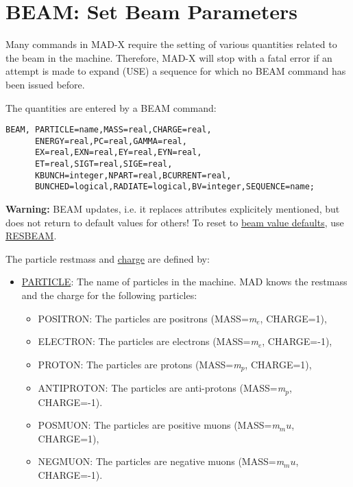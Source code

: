 
\section{BEAM: Set Beam Parameters}

Many commands in MAD-X require the setting of various quantities related
to the beam in the machine. Therefore, MAD-X will stop with a fatal
error if an attempt is made to expand (USE) a sequence for which no BEAM
command has been issued before.  

The quantities are entered by a BEAM command: 
\begin{verbatim}
BEAM, PARTICLE=name,MASS=real,CHARGE=real,
      ENERGY=real,PC=real,GAMMA=real,
      EX=real,EXN=real,EY=real,EYN=real,
      ET=real,SIGT=real,SIGE=real,
      KBUNCH=integer,NPART=real,BCURRENT=real,
      BUNCHED=logical,RADIATE=logical,BV=integer,SEQUENCE=name;
\end{verbatim} 

{\bf Warning:} BEAM updates, i.e. it replaces attributes explicitely
mentioned, but does not return to default values for others! To reset to
\href{resbeam.html#defaults}{beam value defaults},  use
\href{resbeam.html}{RESBEAM}.

The particle restmass and \href{charge}{charge} are defined by:
\begin{itemize}
   \item \href{particle}{PARTICLE}: The name of particles in the
     machine. MAD knows the restmass and the charge for the
     following particles:  
     \begin{itemize}
	  \item POSITRON: The particles are positrons (MASS=\textit{m$_e$}, CHARGE=1), 
	  \item ELECTRON: The particles are electrons (MASS=\textit{m$_e$}, CHARGE=-1), 
	  \item PROTON: The particles are protons (MASS=\textit{m$_p$}, CHARGE=1), 
	  \item ANTIPROTON: The particles are anti-protons (MASS=\textit{m$_p$}, CHARGE=-1). 
	  \item POSMUON: The particles are positive muons (MASS=\textit{m$_mu$}, CHARGE=1), 
	  \item NEGMUON: The particles are negative muons (MASS=\textit{m$_mu$}, CHARGE=-1). 
     \end{itemize}
\end{itemize} 

